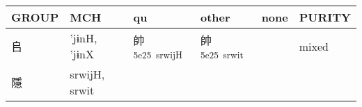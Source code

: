 \documentclass[14pt,a4paper]{scrartcl}
\begin{document}
\begin{longtable}[c]{@{}llllll@{}}
\toprule
\begin{minipage}[b]{0.14\columnwidth}\raggedright\strut
GROUP
\strut\end{minipage} &
\begin{minipage}[b]{0.14\columnwidth}\raggedright\strut
MCH
\strut\end{minipage} &
\begin{minipage}[b]{0.14\columnwidth}\raggedright\strut
qu
\strut\end{minipage} &
\begin{minipage}[b]{0.14\columnwidth}\raggedright\strut
other
\strut\end{minipage} &
\begin{minipage}[b]{0.14\columnwidth}\raggedright\strut
none
\strut\end{minipage} &
\begin{minipage}[b]{0.14\columnwidth}\raggedright\strut
PURITY
\strut\end{minipage}\tabularnewline
\midrule
\endhead
\begin{minipage}[t]{0.14\columnwidth}\raggedright\strut
𠂤
\strut\end{minipage} &
\begin{minipage}[t]{0.14\columnwidth}\raggedright\strut
'jɨnH, 'jɨnX
\strut\end{minipage} &
\begin{minipage}[t]{0.14\columnwidth}\raggedright\strut
帥\textsuperscript{5e25~srwijH}
\strut\end{minipage} &
\begin{minipage}[t]{0.14\columnwidth}\raggedright\strut
帥\textsuperscript{5e25~srwit}
\strut\end{minipage} &
\begin{minipage}[t]{0.14\columnwidth}\raggedright\strut
\strut\end{minipage} &
\begin{minipage}[t]{0.14\columnwidth}\raggedright\strut
mixed
\strut\end{minipage}\tabularnewline
\begin{minipage}[t]{0.14\columnwidth}\raggedright\strut
隱
\strut\end{minipage} &
\begin{minipage}[t]{0.14\columnwidth}\raggedright\strut
srwijH, srwit
\strut\end{minipage} &
\begin{minipage}[t]{0.14\columnwidth}\raggedright\strut
\strut\end{minipage} &

\end{longtable}
\end{document}
